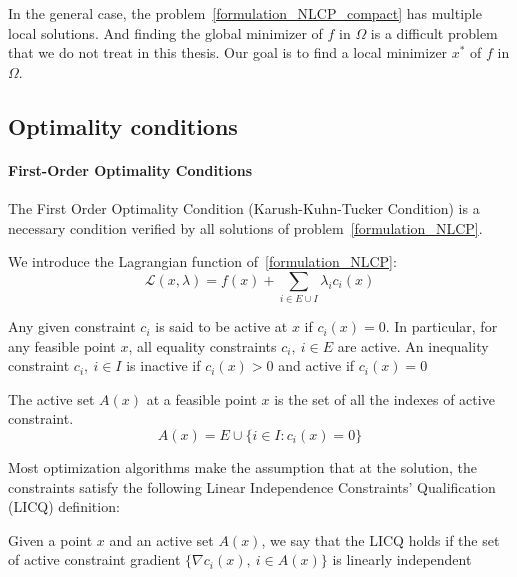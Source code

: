 In the general case, the problem~\ref{formulation_NLCP_compact} has multiple local solutions.
And finding the global minimizer of $f$ in $\Omega$ is a difficult problem that we do not treat in this thesis.
Our goal is to find a local minimizer $x^*$ of $f$ in $\Omega$.

\subsection{Optimality conditions}
\label{sub:optimality_conditions}

\paragraph{First-Order Optimality Conditions}

The First Order Optimality Condition (Karush-Kuhn-Tucker Condition) is a necessary condition verified by all solutions of problem~\ref{formulation_NLCP}.

We introduce the Lagrangian function of~\ref{formulation_NLCP}:
\begin{equation}
  \mathcal{L}(x,\lambda) = f(x) + \sum_{i\in E\cup I}\lambda_i c_i(x)
\end{equation}

Any given constraint $c_i$ is said to be active at $x$ if $c_i(x)=0$.
In particular, for any feasible point $x$, all equality constraints $c_i,\ i\in E$ are active.
An inequality constraint $c_i,\ i\in I$ is inactive if $c_i(x)>0$ and active if $c_i(x) = 0$

\begin{definition}
\label{active_set}
  The active set $\mathit{A}(x)$ at a feasible point $x$ is the set of all the indexes of active constraint.
  \begin{equation}
    \mathit{A}(x)=E\cup\{i\in I: c_i(x) = 0\}
  \end{equation}
\end{definition}

Most optimization algorithms make the assumption that at the solution, the constraints satisfy the following Linear Independence Constraints' Qualification (LICQ) definition:

\begin{definition}
  Given a point $x$ and an active set $\mathit{A}(x)$, we say that the LICQ holds if the set of active constraint gradient $\{\nabla c_i(x),\ i\in \mathit{A}(x)\}$ is linearly independent
\end{definition}

